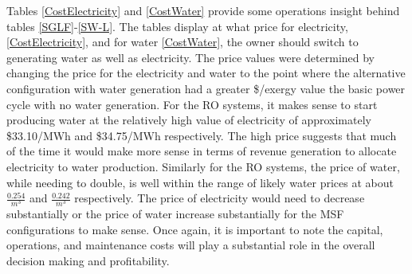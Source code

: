 Tables \ref{CostElectricity} and \ref{CostWater} provide some operations insight behind tables \ref{SGLF}-\ref{SW-L}.  The tables display at what price for electricity, \ref{CostElectricity}, and for water \ref{CostWater}, the owner should switch to generating water as well as electricity. The price values were determined by changing the price for the electricity and water to the point where the alternative configuration with water generation had a greater \$/exergy value the basic power cycle with no water generation.   For the RO systems, it makes sense to start producing water at the relatively high value of electricity of approximately  \$33.10/MWh and \$34.75/MWh respectively.  The high price suggests that much of the time it would make more sense in terms of revenue generation to allocate electricity to water production. Similarly for the RO systems, the price of water, while needing to double, is well within the range of likely water prices at about $\frac{0.254}{m^3}$ and $\frac{0.242}{m^3}$ respectively. The price of electricity would need to decrease substantially or the price of water increase substantially for the MSF configurations to make sense. Once again, it is important to note the capital, operations, and maintenance costs will play a substantial role in the overall decision making and profitability.

